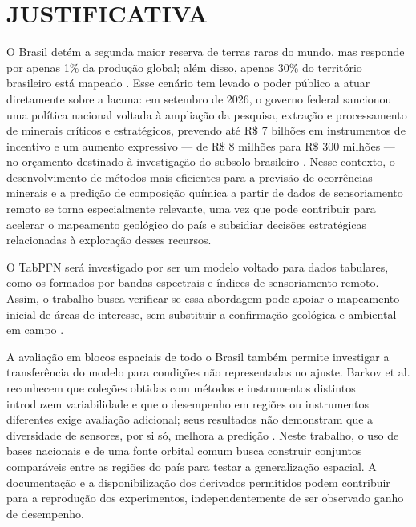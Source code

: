 \section{JUSTIFICATIVA}

O Brasil detém a segunda maior reserva de terras raras do mundo, mas responde por apenas 1\% da produção global; além disso, apenas 30\% do território brasileiro está mapeado \cite{g12026}. Esse cenário tem levado o poder público a atuar diretamente sobre a lacuna: em setembro de 2026, o governo federal sancionou uma política nacional voltada à ampliação da pesquisa, extração e processamento de minerais críticos e estratégicos, prevendo até R\$ 7 bilhões em instrumentos de incentivo e um aumento expressivo --- de R\$ 8 milhões para R\$ 300 milhões --- no orçamento destinado à investigação do subsolo brasileiro \cite{horaextra2026}. Nesse contexto, o desenvolvimento de métodos mais eficientes para a previsão de ocorrências minerais e a predição de composição química a partir de dados de sensoriamento remoto se torna especialmente relevante, uma vez que pode contribuir para acelerar o mapeamento geológico do país e subsidiar decisões estratégicas relacionadas à exploração desses recursos.

O TabPFN será investigado por ser um modelo voltado para dados tabulares, como os formados por bandas espectrais e índices de sensoriamento remoto. Assim, o trabalho busca verificar se essa abordagem pode apoiar o mapeamento inicial de áreas de interesse, sem substituir a confirmação geológica e ambiental em campo \cite{hollmann2025}.

A avaliação em blocos espaciais de todo o Brasil também permite investigar a transferência do modelo para condições não representadas no ajuste. Barkov et al. \cite{barkov2026} reconhecem que coleções obtidas com métodos e instrumentos distintos introduzem variabilidade e que o desempenho em regiões ou instrumentos diferentes exige avaliação adicional; seus resultados não demonstram que a diversidade de sensores, por si só, melhora a predição \cite{barkov2026}. Neste trabalho, o uso de bases nacionais e de uma fonte orbital comum busca construir conjuntos comparáveis entre as regiões do país para testar a generalização espacial. A documentação e a disponibilização dos derivados permitidos podem contribuir para a reprodução dos experimentos, independentemente de ser observado ganho de desempenho.

